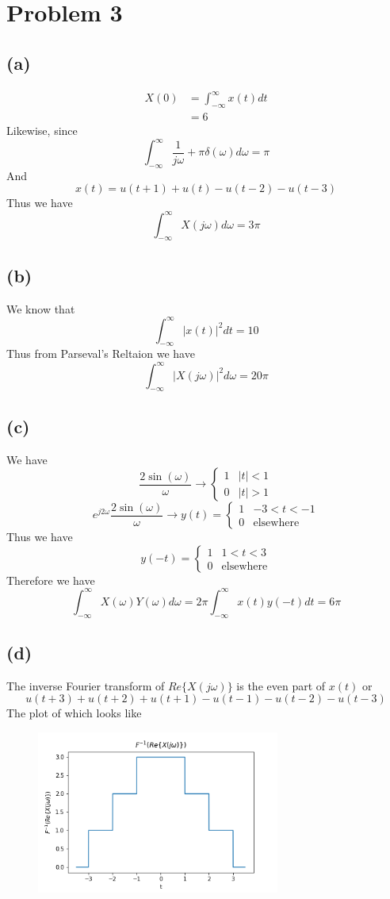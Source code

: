 \documentclass[12pt]{article}
\begin{document}
\section*{Problem 3}
\subsection*{(a)}
\begin{align*}
X(0)&=\int_{-\infty}^{\infty}x(t)dt\\
&=6
\end{align*}
Likewise, since $$\int_{-\infty}^{\infty} \frac{1}{j\omega}+\pi\delta(\omega)d\omega=\pi$$
And 
$$x(t)=u(t+1)+u(t)-u(t-2)-u(t-3)$$
Thus we have
$$\int_{-\infty}^{\infty}X(j\omega)d\omega=3\pi$$
\subsection*{(b)}
We know that
$$\int_{-\infty}^{\infty}\left|x(t)\right|^2dt=10$$
Thus from Parseval's Reltaion we have
$$\int_{-\infty}^{\infty}\left|X(j\omega)\right|^2 d\omega=20\pi$$
\subsection*{(c)}
We have
$$\frac{2\sin(\omega)}{\omega}\to\begin{cases}
1 & |t|<1\\
0 & |t|>1
\end{cases}$$
$$e^{j2\omega}\frac{2\sin(\omega)}{\omega}\to y(t)=\begin{cases}
1 & -3<t<-1\\
0 & \text{elsewhere}
\end{cases}$$
Thus we have
$$y(-t)=\begin{cases}
1 & 1<t<3\\
0 & \text{elsewhere}\end{cases}$$
Therefore we have
$$\int_{-\infty}^{\infty}X(\omega)Y(\omega)d\omega=2\pi\int_{-\infty}^{\infty} x(t)y(-t)dt=6\pi$$
\subsection*{(d)}
The inverse Fourier transform of $Re\{X(j\omega)\}$ is the even part of $x(t)$ or
$$u(t+3)+u(t+2)+u(t+1)-u(t-1)-u(t-2)-u(t-3)$$
The plot of which looks like
\begin{center}
\begin{figure}[h]\includegraphics[width=8cm]{fig1}
\end{figure}
\end{center}
\end{document}
